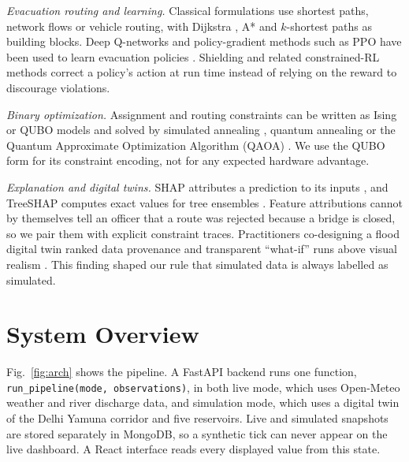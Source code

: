 \documentclass[conference]{IEEEtran}
\begin{document}
\textit{Evacuation routing and learning.} Classical formulations use shortest paths, network flows or vehicle routing, with Dijkstra \cite{Dijkstra1959}, A* \cite{Hart1968} and $k$-shortest paths \cite{Yen1971} as building blocks. Deep Q-networks and policy-gradient methods such as PPO \cite{Schulman2017} have been used to learn evacuation policies \cite{LiuC2025,Raei2026}. Shielding \cite{Alshiekh2018} and related constrained-RL methods \cite{Garcia2015} correct a policy's action at run time instead of relying on the reward to discourage violations.

\textit{Binary optimization.} Assignment and routing constraints can be written as Ising or QUBO models \cite{Lucas2014} and solved by simulated annealing \cite{Kirkpatrick1983}, quantum annealing \cite{Cadelina2024} or the Quantum Approximate Optimization Algorithm (QAOA) \cite{Farhi2014}. We use the QUBO form for its constraint encoding, not for any expected hardware advantage.

\textit{Explanation and digital twins.} SHAP attributes a prediction to its inputs \cite{Lundberg2017}, and TreeSHAP computes exact values for tree ensembles \cite{Lundberg2020}. Feature attributions cannot by themselves tell an officer that a route was rejected because a bridge is closed, so we pair them with explicit constraint traces. Practitioners co-designing a flood digital twin ranked data provenance and transparent ``what-if'' runs above visual realism \cite{Underhill2026}. This finding shaped our rule that simulated data is always labelled as simulated.

\section{System Overview}
Fig.~\ref{fig:arch} shows the pipeline. A FastAPI backend runs one function, \texttt{run\_pipeline(mode, observations)}, in both live mode, which uses Open-Meteo weather and river discharge data, and simulation mode, which uses a digital twin of the Delhi Yamuna corridor and five reservoirs. Live and simulated snapshots are stored separately in MongoDB, so a synthetic tick can never appear on the live dashboard. A React interface reads every displayed value from this state.
\end{document}

